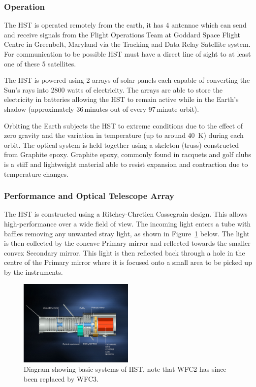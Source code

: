 	\subsubsection{Operation} %
	\label{ssub:operation}
		The HST is operated remotely from the earth, it has 4 antennae which can send and receive signals from the Flight Operations Team at Goddard Space Flight Centre in Greenbelt, Maryland via the Tracking and Data Relay Satellite system. For communication to be possible HST must have a direct line of sight to at least one of these 5 satellites.

		The HST is powered using 2 arrays of solar panels each capable of converting the Sun's rays into \num{2800} watts of electricity. The arrays are able to store the electricity in batteries allowing the HST to remain active while in the Earth's shadow (approximately 36\,minutes out of every 97\,minute orbit).

		Orbiting the Earth subjects the HST to extreme conditions due to the effect of zero gravity and the variation in temperature (up to around \SI{40}{\kelvin}) during each orbit. The optical system is held together using a skeleton (truss) constructed from Graphite epoxy. Graphite epoxy, commonly found in racquets and golf clubs is a stiff and lightweight material able to resist expansion and contraction due to temperature changes\cite{Hubsite_4}.

	\subsubsection{Performance and Optical Telescope Array} %
	\label{ssub:performance_and_optical_telescope_array}
		The HST is constructed using a Ritchey-Chretien Cassegrain design. This allows high-performance over a wide field of view. The incoming light enters a tube with baffles removing any unwanted stray light, as shown in Figure~\ref{fig:HST_optical_diagram} below. The light is then collected by the concave Primary mirror and reflected towards the smaller convex Secondary mirror. This light is then reflected back through a hole in the centre of the Primary mirror where it is focused onto a small area to be picked up by the instruments\cite{Hubsite_5}.
		\begin{figure}[!htbp]
			\centering
			\includegraphics[width=0.5\textwidth]{../Images/HST_optical_diagram.jpg}
			\caption{Diagram showing basic systems of HST, note that WFC2 has since been replaced by WFC3.\label{fig:HST_optical_diagram}}
		\end{figure}

